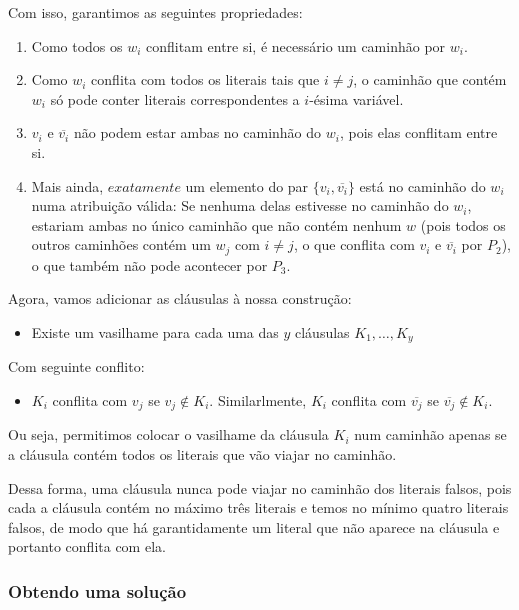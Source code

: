 \documentclass[11pt]{article}
\begin{document}
Com isso, garantimos as seguintes propriedades:

\begin{enumerate}[($P_1$)]
\item Como todos os $w_i$ conflitam entre si, é necessário um
caminhão por $w_i$.

\item Como $w_i$ conflita com todos os literais tais que
$i \neq j$, o caminhão que contém $w_i$ só pode conter literais
correspondentes a $i$-ésima variável.

\item $v_i$ e $\overline{v_i}$ não
podem estar ambas no caminhão do $w_i$, pois elas conflitam entre si.

\item Mais ainda, $\textit{exatamente}$ um elemento do par $\{v_i,
\overline{v_i}\}$ está no caminhão do $w_i$ numa atribuição válida: Se
nenhuma delas estivesse no caminhão do $w_i$, estariam ambas no único
caminhão que não contém nenhum $w$ (pois todos os outros caminhões
contém um $w_j$ com $i \neq j$, o que conflita com $v_i$ e
$\overline{v_i}$ por $P_2$), o que também não pode acontecer por $P_3$.
\end{enumerate}



Agora, vamos adicionar as cláusulas à nossa construção:

\begin{itemize}
\item Existe um vasilhame para cada uma das $y$ cláusulas $K_1, \ldots, K_y$
\end{itemize}

Com seguinte conflito:

\begin{itemize}
\item $K_i$ conflita com $v_j$ se $v_j \not\in K_i$. Similarlmente, $K_i$
  conflita com $\overline{v_j}$ se $\overline{v_j} \not\in K_i$.
\end{itemize}

Ou seja, permitimos colocar o vasilhame da cláusula $K_i$ num caminhão
apenas se a cláusula contém todos os literais que vão viajar no
caminhão.

Dessa forma, uma cláusula nunca pode viajar no caminhão dos literais
falsos, pois cada a cláusula contém no máximo três literais e temos no
mínimo quatro literais falsos, de modo que há garantidamente um
literal que não aparece na cláusula e portanto conflita com ela.

\subsubsection{Obtendo uma solução}
\label{sec-3-2-2}
\end{document}

